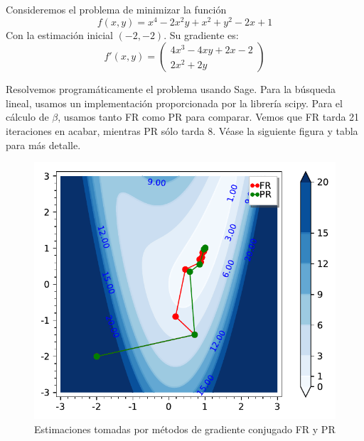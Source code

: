 \begin{example}
	Consideremos el problema de minimizar la función
	\[ f(x,y) = x^4 - 2x^2y+x^2+y^2-2x+1 \]
	Con la estimación inicial $(-2, -2)$. Su gradiente es:
	\[ f'(x,y) = \begin{pmatrix}
		4x^3-4xy+2x-2\\
		2x^2+2y
	\end{pmatrix}\]

Resolvemos programáticamente el problema usando Sage. Para la búsqueda lineal, usamos un implementación proporcionada por la librería scipy. Para el cálculo de $\beta$, usamos tanto FR como PR para comparar. Vemos que FR tarda 21 iteraciones en acabar, mientras PR sólo tarda 8. Véase la siguiente figura y tabla para más detalle.

\begin{figure}[h]
	\centering
	\includegraphics{imagenes/ejemplo_gradConjugado.pdf}
	\caption{Estimaciones tomadas por métodos de gradiente conjugado FR y PR}
\end{figure}


\end{example}
